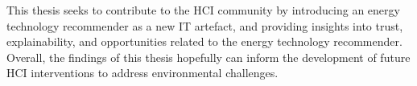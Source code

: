 

This thesis seeks to contribute to the HCI community by 
introducing an energy technology recommender as a new IT artefact, 
and providing insights into trust, explainability, and opportunities related to the energy technology recommender. 
Overall, the findings of this thesis hopefully can inform the development of future HCI interventions to address environmental challenges. 






